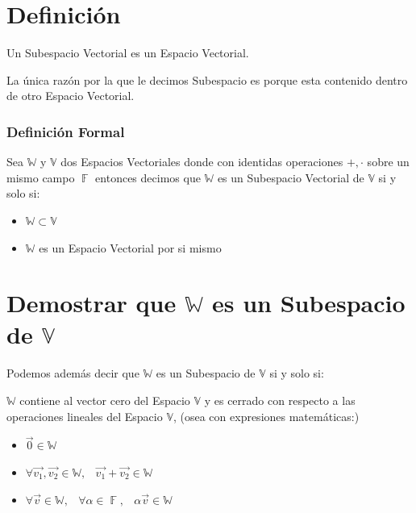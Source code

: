 \documentclass[12pt, fleqn]{report}                             %
\DeclareMathOperator \Space {\quad}                             %
\DeclareMathOperator \MiniSpace {\;}                            %
\theoremstyle{break}                                            %
\DeclareMathOperator \GenericField {\mathbb{F}}                 %
\begin{document}
        \clearpage
        \section{Definición}

            Un Subespacio Vectorial es un Espacio Vectorial.

            La única razón por la que le decimos Subespacio es porque esta contenido dentro de
            otro Espacio Vectorial.

            \subsubsection*{Definición Formal}
                Sea $\mathbb{W}$ y $\mathbb{V}$ dos Espacios Vectoriales donde con identidas
                operaciones $+, \cdot$ sobre un mismo campo $\GenericField$ entonces decimos
                que $\mathbb{W}$ es un Subespacio Vectorial de $\mathbb{V}$ si y solo si:

                \begin{itemize}
                    \item $\mathbb{W} \subset \mathbb{V}$
                    \item $\mathbb{W}$ es un Espacio Vectorial por si mismo
                \end{itemize}


        \section{Demostrar que $\mathbb{W}$ es un Subespacio de $\mathbb{V}$}

            Podemos además decir que $\mathbb{W}$ es un Subespacio de $\mathbb{V}$
            si y solo si:

            $\mathbb{W}$ contiene al vector cero del Espacio $\mathbb{V}$ y es cerrado
            con respecto a las operaciones lineales del Espacio $\mathbb{V}$, (osea con
            expresiones matemáticas:)

            \begin{itemize}
                \item $\vec{0} \in \mathbb{W}$
                
                \item $\forall \vec{v_1}, \vec{v_2} \in \mathbb{W}, \MiniSpace
                            \vec{v_1} + \vec{v_2} \in \mathbb{W}$

                \item $\forall \vec{v} \in \mathbb{W}, \MiniSpace
                            \forall \alpha \in \GenericField, \MiniSpace
                                \alpha \vec{v} \in \mathbb{W}$
             \end{itemize}
\end{document}
